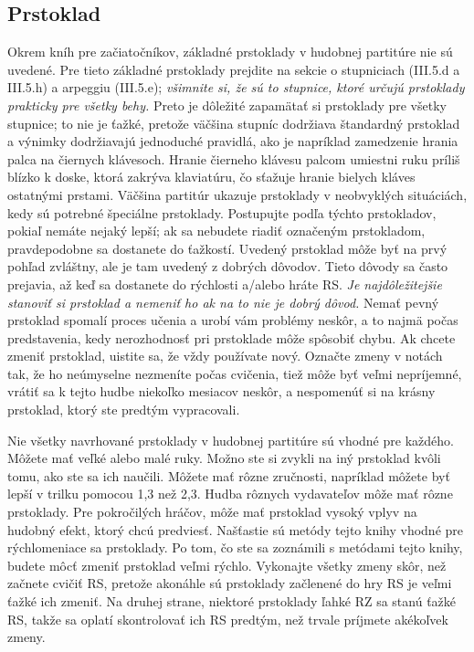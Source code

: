 \subsection{Prstoklad}
Okrem kníh pre začiatočníkov, základné prstoklady v hudobnej partitúre nie sú uvedené. Pre tieto základné prstoklady prejdite na sekcie o stupniciach (III.5.d a III.5.h) a arpeggiu (III.5.e); \emph{všimnite si, že sú to stupnice, ktoré určujú prstoklady prakticky pre všetky behy.} Preto je dôležité zapamätať si prstoklady pre všetky stupnice; to nie je ťažké, pretože väčšina stupníc dodržiava štandardný prstoklad a výnimky dodržiavajú jednoduché pravidlá, ako je napríklad zamedzenie hrania palca na čiernych klávesoch. Hranie čierneho klávesu palcom umiestni ruku príliš blízko k doske, ktorá zakrýva klaviatúru, čo sťažuje hranie bielych kláves ostatnými prstami. Väčšina partitúr ukazuje prstoklady v neobvyklých situáciách, kedy sú potrebné špeciálne prstoklady. Postupujte podľa týchto prstokladov, pokiaľ nemáte nejaký lepší; ak sa nebudete riadiť označeným prstokladom, pravdepodobne sa dostanete do ťažkostí. Uvedený prstoklad môže byť na prvý pohľad zvláštny, ale je tam uvedený z dobrých dôvodov. Tieto dôvody sa často prejavia, až keď sa dostanete do rýchlosti a/alebo hráte RS. \emph{Je najdôležitejšie stanoviť si prstoklad a nemeniť ho ak na to nie je dobrý dôvod.} Nemať pevný prstoklad spomalí proces učenia a urobí vám problémy neskôr, a to najmä počas predstavenia, kedy nerozhodnosť pri prstoklade môže spôsobiť chybu. Ak chcete zmeniť prstoklad, uistite sa, že vždy používate nový. Označte zmeny v notách tak, že ho neúmyselne nezmeníte počas cvičenia, tiež môže byť veľmi nepríjemné, vrátiť sa k tejto hudbe niekoľko mesiacov neskôr, a nespomenúť si na krásny prstoklad, ktorý ste predtým vypracovali.

Nie všetky navrhované prstoklady v hudobnej partitúre sú vhodné pre každého. Môžete mať veľké alebo malé ruky. Možno ste si zvykli na iný prstoklad kvôli tomu, ako ste sa ich naučili. Môžete mať rôzne zručnosti, napríklad môžete byť lepší v trilku pomocou 1,3 než 2,3. Hudba rôznych vydavateľov môže mať rôzne prstoklady. Pre pokročilých hráčov, môže mať prstoklad vysoký vplyv na hudobný efekt, ktorý chcú predviesť. Našťastie sú metódy tejto knihy vhodné pre rýchlomeniace sa prstoklady. Po tom, čo ste sa zoznámili s metódami tejto knihy, budete môcť zmeniť prstoklad veľmi rýchlo. Vykonajte všetky zmeny skôr, než začnete cvičiť RS, pretože akonáhle sú prstoklady začlenené do hry RS je veľmi ťažké ich zmeniť. Na druhej strane, niektoré prstoklady ľahké RZ sa stanú ťažké RS, takže sa oplatí skontrolovať ich RS predtým, než trvale príjmete akékoľvek zmeny.

